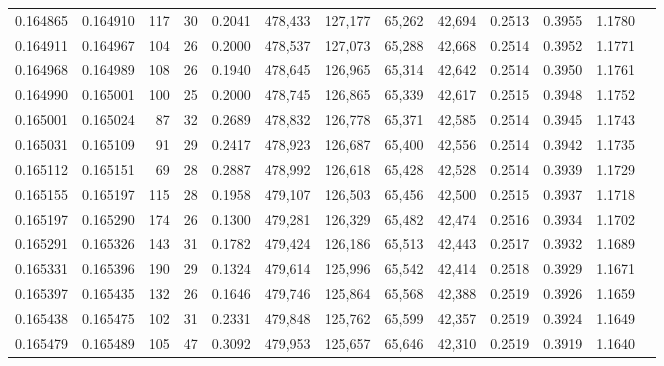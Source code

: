 \begin{tabular}{rrrrrrrrrrrrr}
0.164865 & 0.164910 &   117 &  30 &                                     0.2041 & 478,433 & 127,177 &  65,262 &  42,694 & 0.2513 & 0.3955 & 1.1780 \\
0.164911 & 0.164967 &   104 &  26 &                                     0.2000 & 478,537 & 127,073 &  65,288 &  42,668 & 0.2514 & 0.3952 & 1.1771 \\
0.164968 & 0.164989 &   108 &  26 &                                     0.1940 & 478,645 & 126,965 &  65,314 &  42,642 & 0.2514 & 0.3950 & 1.1761 \\
0.164990 & 0.165001 &   100 &  25 &                                     0.2000 & 478,745 & 126,865 &  65,339 &  42,617 & 0.2515 & 0.3948 & 1.1752 \\
0.165001 & 0.165024 &    87 &  32 &                                     0.2689 & 478,832 & 126,778 &  65,371 &  42,585 & 0.2514 & 0.3945 & 1.1743 \\
0.165031 & 0.165109 &    91 &  29 &                                     0.2417 & 478,923 & 126,687 &  65,400 &  42,556 & 0.2514 & 0.3942 & 1.1735 \\
0.165112 & 0.165151 &    69 &  28 &                                     0.2887 & 478,992 & 126,618 &  65,428 &  42,528 & 0.2514 & 0.3939 & 1.1729 \\
0.165155 & 0.165197 &   115 &  28 &                                     0.1958 & 479,107 & 126,503 &  65,456 &  42,500 & 0.2515 & 0.3937 & 1.1718 \\
0.165197 & 0.165290 &   174 &  26 &                                     0.1300 & 479,281 & 126,329 &  65,482 &  42,474 & 0.2516 & 0.3934 & 1.1702 \\
0.165291 & 0.165326 &   143 &  31 &                                     0.1782 & 479,424 & 126,186 &  65,513 &  42,443 & 0.2517 & 0.3932 & 1.1689 \\
0.165331 & 0.165396 &   190 &  29 &                                     0.1324 & 479,614 & 125,996 &  65,542 &  42,414 & 0.2518 & 0.3929 & 1.1671 \\
0.165397 & 0.165435 &   132 &  26 &                                     0.1646 & 479,746 & 125,864 &  65,568 &  42,388 & 0.2519 & 0.3926 & 1.1659 \\
0.165438 & 0.165475 &   102 &  31 &                                     0.2331 & 479,848 & 125,762 &  65,599 &  42,357 & 0.2519 & 0.3924 & 1.1649 \\
0.165479 & 0.165489 &   105 &  47 &                                     0.3092 & 479,953 & 125,657 &  65,646 &  42,310 & 0.2519 & 0.3919 & 1.1640 \\

\end{tabular}

